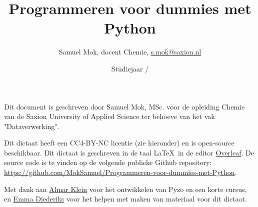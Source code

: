 \documentclass[a4paper,12pt,oneside]{book}
\title{Programmeren voor dummies met Python}
\author{Samuel Mok, docent Chemie, \href{s.mok@saxion.nl}{\textsf{s.mok@saxion.nl}}}
\date{Studiejaar \PrevYear/\the\year}
\begin{document}
\lstset{language=python}
\lstset{style=mystyle}

\maketitle

Dit document is geschreven door Samuel Mok, MSc. voor de opleiding Chemie van de Saxion University of Applied Science ter behoeve van het vak "Dataverwerking". 


Dit dictaat heeft een CC4-BY-NC licentie (zie hieronder) en is open-source beschikbaar. Dit dictaat is geschreven in de taal \LaTeX\ in de editor \href{https://www.overleaf.com}{Overleaf}. De source code is te vinden op de volgende publieke Github repository: \href{https://github.com/MokSamuel/Programmeren-voor-dummies-met-Python}{https://github.com/MokSamuel/Programmeren-voor-dummies-met-Python}.


\doclicenseThis

Met dank aan \href{https://almarklein.org/}{Almar Klein} voor het ontwikkelen van Pyzo en een korte cursus, en \href{https://www.linkedin.com/in/emma-diederiks-75a3b166}{Emma Diederiks} voor het helpen met maken van materiaal voor dit dictaat.
\tableofcontents





\begin{appendices}

\end{appendices}
\end{document}
